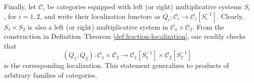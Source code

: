 \begin{remark}\label{rem:localization-product-cat}
	Finally, let $\mathcal{C}_i$ be categories equipped with left (or right)
	multiplicative systems $S_i$, for $i=1,2$, and write their localization
	functors as $Q_i:\mathcal{C}_i\to\mathcal{C}_i[S_i^{-1}]$. Clearly,
	$S_1\times S_2$ is also a left (or right) multiplicative system in
	$\mathcal{C}_1\times\mathcal{C}_2$. From the construction in
	Definition--Theorem \ref{def:fraction-localization}, one readily checks that
	\[ (Q_1, Q_2): \mathcal{C}_1 \times \mathcal{C}_2 \to \mathcal{C}_1[S_1^{-1}] \times \mathcal{C}_2[S_2^{-1}] \]
	is the corresponding localization. This statement generalizes to products
	of arbitrary families of categories.
\end{remark}
